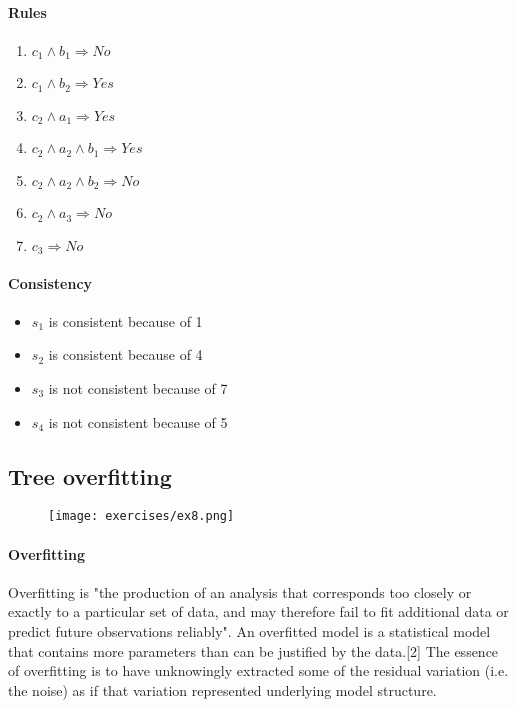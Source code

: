 \paragraph{Rules}
\begin{enumerate}

\item $c_1 \wedge b_1 \Rightarrow No $
\item $c_1 \wedge b_2 \Rightarrow Yes $
\item $c_2 \wedge a_1 \Rightarrow Yes $
\item $c_2 \wedge a_2 \wedge b_1 \Rightarrow Yes $
\item $c_2 \wedge a_2 \wedge b_2 \Rightarrow No $
\item $c_2 \wedge a_3 \Rightarrow No $
\item $c_3  \Rightarrow No $
\end{enumerate}

\paragraph{Consistency}
\begin{itemize}
\item $s_1$ is consistent because of  1 
\item $s_2$ is consistent because of  4
\item $s_3$ is not consistent because of  7 
\item $s_4$ is not consistent because of  5
\end{itemize}

\subsection{Tree overfitting}
\begin{figure}[H]
    \centering
    \texttt{[image: exercises/ex8.png]}
\end{figure}


\paragraph{Overfitting}
Overfitting is "the production of an analysis that corresponds too closely or exactly to a particular set of data, and may therefore fail to fit additional data or predict future observations reliably". An overfitted model is a statistical model that contains more parameters than can be justified by the data.[2] The essence of overfitting is to have unknowingly extracted some of the residual variation (i.e. the noise) as if that variation represented underlying model structure.


